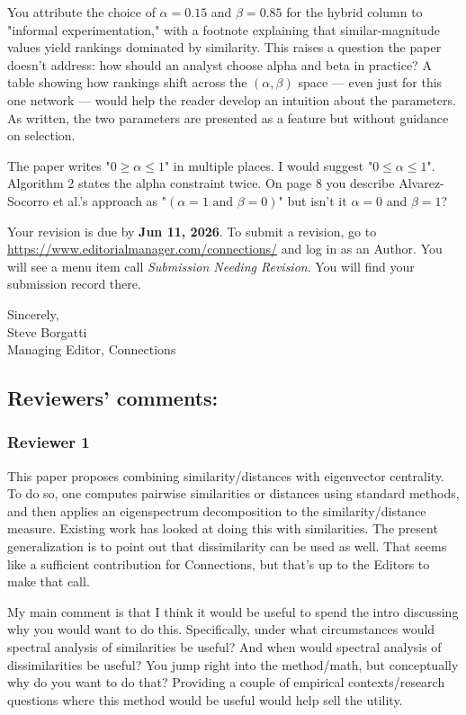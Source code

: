 \documentclass[11pt]{article}
\begin{document}
You attribute the choice of $\alpha=0.15$ and $\beta=0.85$ for the hybrid column to "informal experimentation," with a footnote explaining that similar-magnitude values yield rankings dominated by similarity. This raises a question the paper doesn't address: how should an analyst choose alpha and beta in practice? A table showing how rankings shift across the $(\alpha, \beta)$ space — even just for this one network — would help the reader develop an intuition about the parameters. As written, the two parameters are presented as a feature but without guidance on selection.

The paper writes "$0 \ge \alpha \le 1$" in multiple places. I would suggest "$0 \le \alpha \le 1$". Algorithm 2 states the alpha constraint twice. On page 8 you describe Alvarez-Socorro et al.'s approach as "$(\alpha=1 \text{ and } \beta=0)$" but isn't it $\alpha=0$ and $\beta=1$?

Your revision is due by \textbf{Jun 11, 2026}. To submit a revision, go to \url{https://www.editorialmanager.com/connections/} and log in as an Author. You will see a menu item call \textit{Submission Needing Revision}. You will find your submission record there.

\vspace{1em}
\noindent Sincerely, \\
Steve Borgatti \\
Managing Editor, Connections

\pagebreak

\subsection*{Reviewers' comments:}

\subsubsection*{Reviewer 1}
This paper proposes combining similarity/distances with eigenvector centrality. To do so, one computes pairwise similarities or distances using standard methods, and then applies an eigenspectrum decomposition to the similarity/distance measure. Existing work has looked at doing this with similarities. The present generalization is to point out that dissimilarity can be used as well. That seems like a sufficient contribution for Connections, but that's up to the Editors to make that call.

My main comment is that I think it would be useful to spend the intro discussing why you would want to do this. Specifically, under what circumstances would spectral analysis of similarities be useful? And when would spectral analysis of dissimilarities be useful? You jump right into the method/math, but conceptually why do you want to do that? Providing a couple of empirical contexts/research questions where this method would be useful would help sell the utility.
\end{document}
